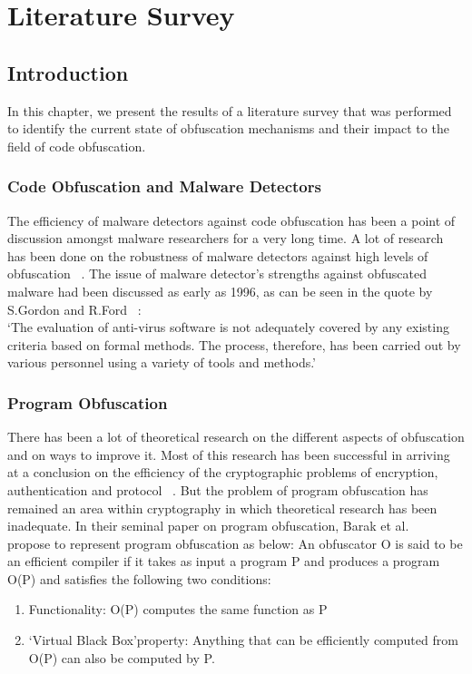 \chapter{Literature Survey}

\section{Introduction}
In this chapter, we present the results of a literature survey that was performed to identify the current state of obfuscation mechanisms and their impact to the field of code obfuscation.

\subsection{Code Obfuscation and Malware Detectors}

The efficiency of malware detectors against code obfuscation has been a point of discussion
amongst malware researchers for a very long time. A lot of research has been done on the
robustness of malware detectors against high levels of obfuscation ~\cite{Christodorescu}. The issue of malware detector\textquoteright s strengths against obfuscated malware had been discussed as early as 1996, as can be
seen in the quote by S.Gordon and R.Ford ~\cite{gordon}: \\
\textquoteleft The evaluation of anti-virus software is not adequately covered by any existing criteria based
on formal methods. The process, therefore, has been carried out by various personnel using a
variety of tools and methods.\textquoteright


\subsection{Program Obfuscation}

There has been a lot of theoretical research on the different aspects of obfuscation and on ways to improve it. Most of this research has been successful in arriving at a conclusion on the efficiency of the cryptographic problems of encryption, authentication and protocol ~\cite{barak}. But the problem of program obfuscation has remained an area within cryptography in which theoretical research has been inadequate. In their seminal paper on program obfuscation, Barak et al. ~\cite{barak} propose to represent program obfuscation as below:
An obfuscator O is said to be an efficient compiler if it takes as input a program P and produces a program O(P) and satisfies the following two conditions:
\begin{enumerate}
	\item Functionality: O(P) computes the same function as P
	\item \textquoteleft Virtual Black Box\textquoteright property: Anything that can be efficiently computed from O(P) can also be computed by P.
\end{enumerate}

